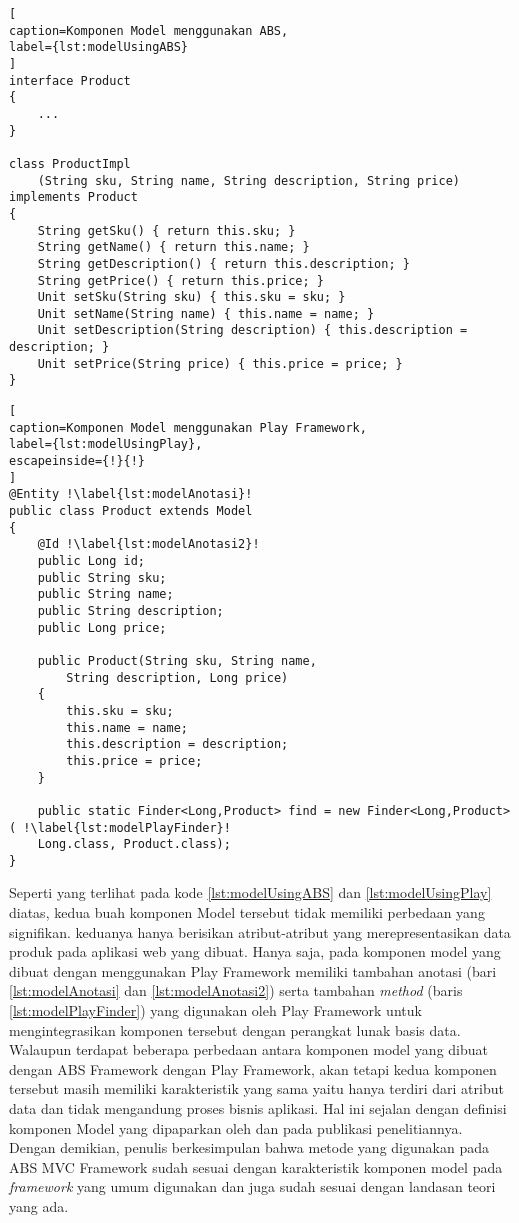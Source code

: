 \begin{lstlisting}[
caption=Komponen Model menggunakan ABS,
label={lst:modelUsingABS}
]
interface Product
{
    ...
}

class ProductImpl 
	(String sku, String name, String description, String price) implements Product
{
	String getSku() { return this.sku; }
	String getName() { return this.name; }
	String getDescription() { return this.description; }
	String getPrice() { return this.price; }
	Unit setSku(String sku) { this.sku = sku; }
	Unit setName(String name) { this.name = name; }
	Unit setDescription(String description) { this.description = description; }
	Unit setPrice(String price) { this.price = price; }
}
\end{lstlisting}

\begin{lstlisting}[
caption=Komponen Model menggunakan Play Framework,
label={lst:modelUsingPlay},
escapeinside={!}{!}
]
@Entity !\label{lst:modelAnotasi}!
public class Product extends Model
{
	@Id !\label{lst:modelAnotasi2}!
	public Long id;
	public String sku;
	public String name;
	public String description;
	public Long price;

	public Product(String sku, String name,
		String description, Long price)
	{
		this.sku = sku;
		this.name = name;
		this.description = description;
		this.price = price;
	}

	public static Finder<Long,Product> find = new Finder<Long,Product>( !\label{lst:modelPlayFinder}!
    Long.class, Product.class); 
}
\end{lstlisting}

Seperti yang terlihat pada kode \ref{lst:modelUsingABS} dan \ref{lst:modelUsingPlay} diatas, kedua buah komponen Model tersebut tidak memiliki perbedaan yang signifikan. keduanya hanya berisikan atribut-atribut yang merepresentasikan data produk pada aplikasi web yang dibuat. Hanya saja, pada komponen model yang dibuat dengan menggunakan Play Framework memiliki tambahan anotasi (bari \ref{lst:modelAnotasi} dan \ref{lst:modelAnotasi2}) serta tambahan \textit{method} (baris \ref{lst:modelPlayFinder}) yang digunakan oleh Play Framework untuk mengintegrasikan komponen tersebut dengan perangkat lunak basis data.\\

Walaupun terdapat beberapa perbedaan antara komponen model yang dibuat dengan ABS Framework dengan Play Framework, akan tetapi kedua komponen tersebut masih memiliki karakteristik yang sama yaitu hanya terdiri dari atribut data dan tidak mengandung proses bisnis aplikasi. Hal ini sejalan dengan definisi komponen Model yang dipaparkan oleh \cite{krasner1988desc} dan \cite{leff2001web} pada publikasi penelitiannya. Dengan demikian, penulis berkesimpulan bahwa metode yang digunakan pada ABS MVC Framework sudah sesuai dengan karakteristik komponen model pada \textit{framework} yang umum digunakan dan juga sudah sesuai dengan landasan teori yang ada.

